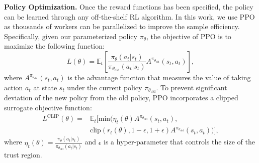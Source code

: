     \vspace{1pt}
    \noindent\textbf{Policy Optimization.}
    Once the reward functions has been specified, the policy can be learned through any off-the-shelf RL algorithm. 
    In this work, we use PPO as thousands of workers can be parallelized to improve the sample efficiency. 
    Specifically, given our parameterized policy $\pi_\theta$, the objective of PPO is to maximize the following function:
        \begin{equation}
        L(\theta) = \mathbb{E}_{t}\left[\frac{\pi_\theta(a_t|s_t)}{\pi_{\theta_\text{old}}(a_t|s_t)} A^{\pi_{\theta_\text{old}}}(s_t, a_t)\right],
        \end{equation}
     where $A^{\pi_{\theta_\text{old}}}(s_t, a_t)$ is the advantage function that measures the value of taking action $a_t$ at state $s_t$ under the current policy $\pi_{\theta_\text{old}}$.
    To prevent significant deviation of the new policy from the old policy, PPO incorporates a clipped surrogate objective function:
        \begin{equation}
            \begin{split}
            L^\text{CLIP}(\theta) =  &\mathbb{E}_{t}[\text{min}(\eta_t(\theta) A^{\pi_{\theta_\text{old}}}(s_t, a_t), \\
                                    &\text{clip}(r_t(\theta), 1 - \epsilon, 1 + \epsilon) A^{\pi_{\theta_\text{old}}}(s_t, a_t))] ,
            \end{split}
        \end{equation}
        where $\eta_t(\theta) = \frac{\pi_\theta(a_t|s_t)}{\pi_{\theta_\text{old}}(a_t|s_t)}$ and $\epsilon$ is a hyper-parameter that controls the size of the trust region.  

